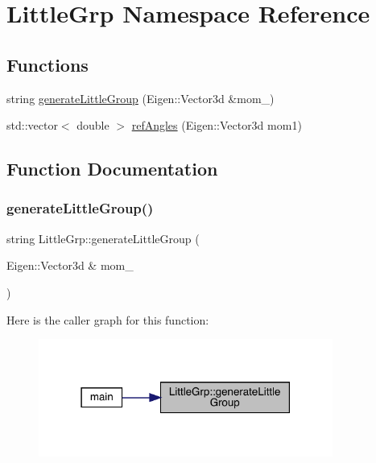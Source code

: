 \hypertarget{namespaceLittleGrp}{}\section{Little\+Grp Namespace Reference}
\label{namespaceLittleGrp}
\subsection*{Functions}
\begin{DoxyCompactItemize}
\item 
string \mbox{\hyperlink{namespaceLittleGrp_a12887808e1a825e9d2c387c5475bcf88}{generate\+Little\+Group}} (Eigen\+::\+Vector3d \&mom\+\_\+)
\item 
std\+::vector$<$ double $>$ \mbox{\hyperlink{namespaceLittleGrp_a93937e135b6b9c963ae9ad26516e252d}{ref\+Angles}} (Eigen\+::\+Vector3d mom1)
\end{DoxyCompactItemize}


\subsection{Function Documentation}
\mbox{\label{namespaceLittleGrp_a12887808e1a825e9d2c387c5475bcf88}} 
\subsubsection{\texorpdfstring{generateLittleGroup()}{generateLittleGroup()}}
{\footnotesize\ttfamily string Little\+Grp\+::generate\+Little\+Group (\begin{DoxyParamCaption}\item[{Eigen\+::\+Vector3d \&}]{mom\+\_\+ }\end{DoxyParamCaption})}

Here is the caller graph for this function\+:
\nopagebreak
\begin{figure}[H]
\begin{center}
\leavevmode
\includegraphics[width=274pt]{d1/d4c/namespaceLittleGrp_a12887808e1a825e9d2c387c5475bcf88_icgraph}
\end{center}
\end{figure}
\mbox{\label{namespaceLittleGrp_a93937e135b6b9c963ae9ad26516e252d}} 
